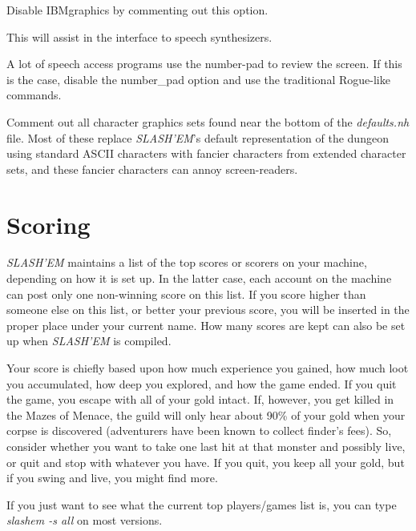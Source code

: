 \blist{}

\item[\ib{IBMgraphics}]
Disable IBMgraphics by commenting out this option.

\item[\ib{menustyle:traditional}]
This will assist in the interface to speech synthesizers.

\item[\ib{number\_pad}]
A lot of speech access programs use the number-pad to review the screen.
If this is the case, disable the number\_pad option and use the traditional
Rogue-like commands.

\item[\ib{Character graphics}]
Comment out all character graphics sets found near the bottom of the
{\it defaults.nh\/} file.  Most of these replace {\it {\it SLASH'EM\/}\/}'s
default representation of the dungeon using standard ASCII characters
with fancier characters from extended character sets, and these fancier
characters can annoy screen-readers.
\elist
\nd %
\section{Scoring}


{\it SLASH'EM\/} maintains a list of the top scores or scorers on your machine,
depending on how it is set up.  In the latter case, each account on
the machine can post only one non-winning score on this list.  If
you score higher than someone else on this list, or better your
previous score, you will be inserted in the proper place under your
current name.  How many scores are kept can also be set up when
{\it SLASH'EM\/} is compiled.

Your score is chiefly based upon how much experience you gained, how
much loot you accumulated, how deep you explored, and how the game
ended.  If you quit the game, you escape with all of your gold intact.
If, however, you get killed in the Mazes of Menace, the guild will
only hear about 90\% of your gold when your corpse is discovered
(adventurers have been known to collect finder's fees).  So, consider
whether you want to take one last hit at that monster and possibly
live, or quit and stop with whatever you have.  If you quit, you keep
all your gold, but if you swing and live, you might find more.

If you just want to see what the current top players/games list is, you
can type {\it slashem -s all\/} on most versions.

